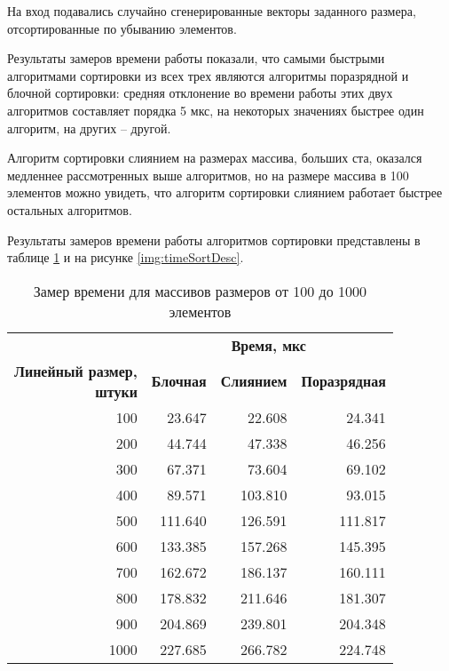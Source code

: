 На вход подавались случайно сгенерированные векторы заданного размера, отсортированные по убыванию элементов.

Результаты замеров времени работы показали, что самыми быстрыми алгоритмами сортировки из всех трех являются алгоритмы поразрядной и блочной сортировки: средняя отклонение во времени работы этих двух алгоритмов составляет порядка 5 мкс, на некоторых значениях быстрее один алгоритм, на других -- другой.

Алгоритм сортировки слиянием на размерах массива, больших ста, оказался медленнее рассмотренных выше алгоритмов, но на размере массива в 100 элементов можно увидеть, что алгоритм сортировки слиянием работает быстрее остальных алгоритмов.

Результаты замеров времени работы алгоритмов сортировки представлены в таблице \ref{tbl:timeDesc} и на рисунке \ref{img:timeSortDesc}.

\begin{table}[ht]
	\small
	\begin{center}
		\begin{threeparttable}
			\caption{Замер времени для массивов размеров от 100 до 1000 элементов}
			\label{tbl:timeDesc}
			\begin{tabular}{|r|r|r|r|}
				\hline
				& \multicolumn{3}{c|}{\bfseries Время, мкс} \\ \cline{2-4}
				\bfseries \makecell{Линейный размер, \\ штуки} & \bfseries Блочная & \bfseries Слиянием & \bfseries Поразрядная \\ \cline{2-4}
				\hline
				100 & 23.647 & 22.608 & 24.341 \\
				\hline
				200 & 44.744 & 47.338 & 46.256 \\
				\hline
				300 & 67.371 & 73.604 & 69.102 \\
				\hline
				400 & 89.571 & 103.810 & 93.015 \\
				\hline
				500 & 111.640 & 126.591 & 111.817 \\
				\hline
				600 & 133.385 & 157.268 & 145.395 \\
				\hline
				700 & 162.672 & 186.137 & 160.111 \\
				\hline
				800 & 178.832 & 211.646 & 181.307 \\
				\hline
				900 & 204.869 & 239.801 & 204.348 \\
				\hline
				1000 & 227.685 & 266.782 & 224.748 \\
				\hline
			\end{tabular}	
		\end{threeparttable}
	\end{center}
\end{table}

